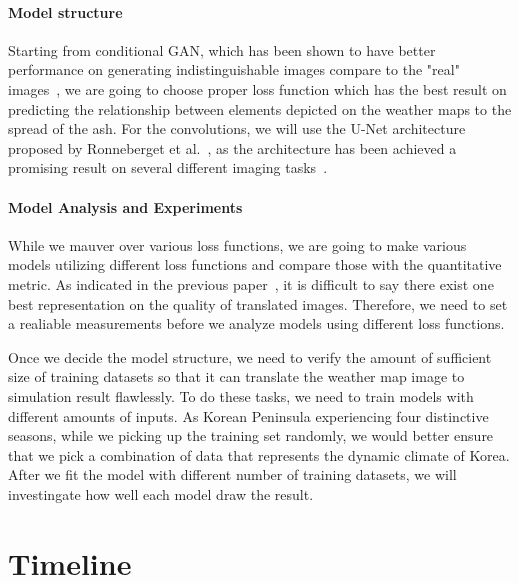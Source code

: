 \documentclass{article}
\begin{document}
\begin{doublespacing}
{  \paragraph{Model structure}
  Starting from conditional GAN, which has been shown to have better performance on generating 
  indistinguishable images compare to the "real" images~\citet{isola2016imagetoimage}, we are going 
  to choose proper loss function which has the best result on predicting the relationship between 
  elements depicted on the weather maps to the spread of the ash. For the convolutions, we will use
  the U-Net architecture proposed by Ronneberget et al.~\citet{ronneberger2015unet}, as the
  architecture has been achieved a promising result on several different imaging 
  tasks~\citep{isola2016imagetoimage, james2018simtoreal}.

  \paragraph{Model Analysis and Experiments}
  While we mauver over various loss functions, we are going to make various models utilizing 
  different loss functions and compare those with the quantitative metric. As indicated in the 
  previous paper~\citet{isola2016imagetoimage}, it is difficult to say there exist one best 
  representation on the quality of translated images. Therefore, we need to set a realiable 
  measurements before we analyze models using different loss functions.

  Once we decide the model structure, we need to verify the amount of sufficient size of training 
  datasets so that it can translate the weather map image to simulation result flawlessly. To do 
  these tasks, we need to train models with different amounts of inputs. As Korean Peninsula 
  experiencing four distinctive seasons, while we picking up the training set randomly, we would 
  better ensure that we pick a combination of data that represents the dynamic climate of Korea. 
  After we fit the model with different number of training datasets, we will investingate how well 
  each model draw the result.
}

\section{Timeline} %
\fontsize{11pt}{11pt} \selectfont {
  The first thing we should do is to get the input. As there is no available API to get the weather 
  maps and data from KMA, but they provide an interactive website to download the data, it might 
  take some time to get all data manually. Moreover, the calculation time for that simulation was 
  not ignorable, according to previous experiment (it takes approximately one hour to get one output
  with the laptop having Intel’s i5-3320M CPU). Considering the factor that we have access to better
  computing power than the previous test, we are expecting to finish data collection within two 
  months after project initiated.

}
\end{doublespacing}
\end{document}
